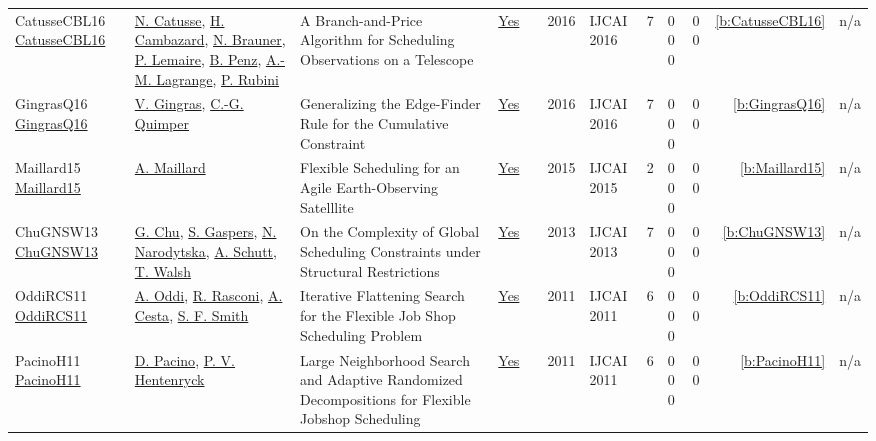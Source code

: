 {\begin{longtable}{>{\raggedright\arraybackslash}p{3cm}>{\raggedright\arraybackslash}p{4.5cm}>{\raggedright\arraybackslash}p{6.0cm}rrrp{2.5cm}rp{1cm}p{1cm}rr}
CatusseCBL16 \href{http://www.ijcai.org/Abstract/16/434}{CatusseCBL16} & \hyperref[auth:a998]{N. Catusse}, \hyperref[auth:a999]{H. Cambazard}, \hyperref[auth:a1000]{N. Brauner}, \hyperref[auth:a979]{P. Lemaire}, \hyperref[auth:a1001]{B. Penz}, \hyperref[auth:a1002]{A.-M. Lagrange}, \hyperref[auth:a1003]{P. Rubini} & A Branch-and-Price Algorithm for Scheduling Observations on a Telescope & \href{../works/CatusseCBL16.pdf}{Yes} & \cite{CatusseCBL16} & 2016 & IJCAI 2016 & 7 & 0 0 0 & 0 0 & \ref{b:CatusseCBL16} & n/a\\
GingrasQ16 \href{http://www.ijcai.org/Abstract/16/440}{GingrasQ16} & \hyperref[auth:a313]{V. Gingras}, \hyperref[auth:a37]{C.-G. Quimper} & Generalizing the Edge-Finder Rule for the Cumulative Constraint & \href{../works/GingrasQ16.pdf}{Yes} & \cite{GingrasQ16} & 2016 & IJCAI 2016 & 7 & 0 0 0 & 0 0 & \ref{b:GingrasQ16} & n/a\\
Maillard15 \href{http://ijcai.org/Abstract/15/637}{Maillard15} & \hyperref[auth:a787]{A. Maillard} & Flexible Scheduling for an Agile Earth-Observing Satelllite & \href{../works/Maillard15.pdf}{Yes} & \cite{Maillard15} & 2015 & IJCAI 2015 & 2 & 0 0 0 & 0 0 & \ref{b:Maillard15} & n/a\\
ChuGNSW13 \href{http://www.aaai.org/ocs/index.php/IJCAI/IJCAI13/paper/view/6878}{ChuGNSW13} & \hyperref[auth:a343]{G. Chu}, \hyperref[auth:a793]{S. Gaspers}, \hyperref[auth:a794]{N. Narodytska}, \hyperref[auth:a124]{A. Schutt}, \hyperref[auth:a276]{T. Walsh} & On the Complexity of Global Scheduling Constraints under Structural Restrictions & \href{../works/ChuGNSW13.pdf}{Yes} & \cite{ChuGNSW13} & 2013 & IJCAI 2013 & 7 & 0 0 0 & 0 0 & \ref{b:ChuGNSW13} & n/a\\
OddiRCS11 \href{https://doi.org/10.5591/978-1-57735-516-8/IJCAI11-332}{OddiRCS11} & \hyperref[auth:a282]{A. Oddi}, \hyperref[auth:a1271]{R. Rasconi}, \hyperref[auth:a284]{A. Cesta}, \hyperref[auth:a298]{S. F. Smith} & Iterative Flattening Search for the Flexible Job Shop Scheduling Problem & \href{../works/OddiRCS11.pdf}{Yes} & \cite{OddiRCS11} & 2011 & IJCAI 2011 & 6 & 0 0 0 & 0 0 & \ref{b:OddiRCS11} & n/a\\
PacinoH11 \href{https://doi.org/10.5591/978-1-57735-516-8/IJCAI11-333}{PacinoH11} & \hyperref[auth:a1448]{D. Pacino}, \hyperref[auth:a148]{P. V. Hentenryck} & Large Neighborhood Search and Adaptive Randomized Decompositions for Flexible Jobshop Scheduling & \href{../works/PacinoH11.pdf}{Yes} & \cite{PacinoH11} & 2011 & IJCAI 2011 & 6 & 0 0 0 & 0 0 & \ref{b:PacinoH11} & n/a\\

\end{longtable}}
